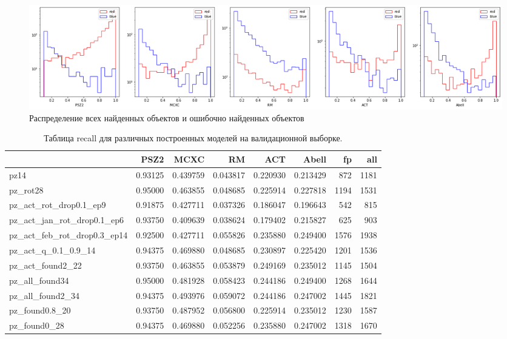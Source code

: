 \documentclass{article}
\begin{document}
\begin{figure}[h]
\includegraphics[width=\linewidth]{hist}
\caption{Распределение всех найденных объектов и ошибочно найденных объектов}
\label{Fig:Hist}
\end{figure}

\begin{table}[h]
\begin{tabular}{lrrrrrrr}
\toprule
{} &     PSZ2 &      MCXC &        RM &       ACT &     Abell &    fp &   all \\
\midrule
pz14                        &  0.93125 &  0.439759 &  0.043817 &  0.220930 &  0.213429 &   872 &  1181 \\
pz\_rot28                    &  0.95000 &  0.463855 &  0.048685 &  0.225914 &  0.227818 &  1194 &  1531 \\
pz\_act\_rot\_drop0.1\_ep9      &  0.91875 &  0.427711 &  0.037326 &  0.186047 &  0.196643 &   542 &   815 \\
pz\_act\_jan\_rot\_drop0.1\_ep6  &  0.93750 &  0.409639 &  0.038624 &  0.179402 &  0.215827 &   625 &   903 \\
pz\_act\_feb\_rot\_drop0.3\_ep14 &  0.92500 &  0.427711 &  0.055826 &  0.235880 &  0.249400 &  1576 &  1938 \\
pz\_act\_q\_0.1\_0.9\_14         &  0.94375 &  0.469880 &  0.048685 &  0.230897 &  0.225420 &  1201 &  1536 \\
pz\_act\_found2\_22            &  0.93750 &  0.463855 &  0.053879 &  0.249169 &  0.235012 &  1145 &  1504 \\
pz\_all\_found34              &  0.95000 &  0.481928 &  0.058423 &  0.244186 &  0.249400 &  1268 &  1644 \\
pz\_all\_found2\_34            &  0.94375 &  0.493976 &  0.059072 &  0.244186 &  0.247002 &  1445 &  1821 \\
pz\_found0.8\_20              &  0.93750 &  0.487952 &  0.056800 &  0.225914 &  0.235012 &  1230 &  1587 \\
pz\_found0\_28                &  0.94375 &  0.469880 &  0.052256 &  0.235880 &  0.247002 &  1318 &  1670 \\
\bottomrule
\end{tabular}
\label{Tab:Recall}
\caption{Таблица recall для различных построенных моделей на валидационной выборке.}
\end{table}
\end{document}
